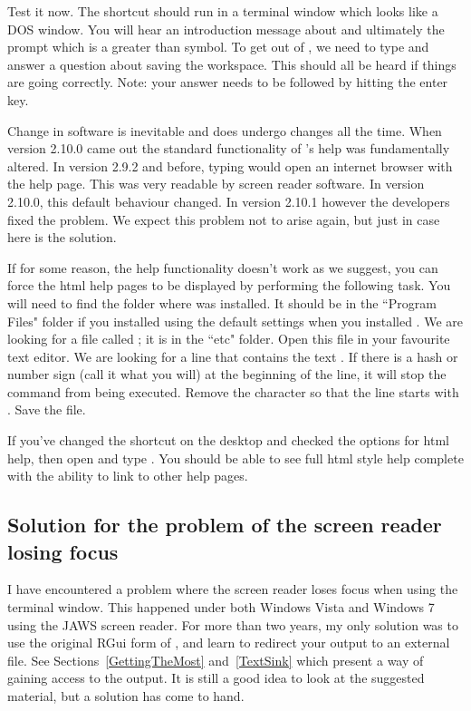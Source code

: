 Test it now. The shortcut should run \R{} in a terminal window which looks like a DOS window. You will hear an introduction message about \R{} and ultimately the prompt which is a greater than symbol. To get out of \R{}, we need to type  and answer a question about saving the workspace. This should all be heard if things are going correctly. Note: your answer needs to be followed by hitting the enter key.

Change in software is inevitable and \R{} does undergo changes all the time. When version 2.10.0 came out the standard functionality of \R{}'s help was fundamentally altered. In version 2.9.2 and before, typing  would open an internet browser with the help page. This was very readable by screen reader software. In version 2.10.0, this default behaviour changed. In version 2.10.1 however the developers fixed the problem. We expect this problem not to arise again, but just in case here is the solution.

If for some reason, the help functionality doesn't work as we suggest, you can force the html help pages to be displayed by performing the following task.
You will need to find the folder where \R{} was installed. It should be in the ``Program Files" folder if you installed using the default settings when you installed \R{}. We are looking for a file called ; it is in the ``etc" folder. Open this file in your favourite text editor. We are looking for a line that contains the text . If there is a hash or number sign (call it what you will) at the beginning of the line, it will stop the command from being executed. Remove the character so that the line starts with . Save the file.

If you've changed the shortcut on the desktop and checked the options for html help, then open \R{} and type . You should be able to see full html style help complete with the ability to link to other help pages.

\subsection{Solution for the problem of the screen reader losing focus}

I have encountered a problem where the screen reader loses focus when using the terminal window. This happened under both Windows Vista and Windows 7 using the JAWS screen reader. For more than two years, my only solution was to use the original RGui form of \R{}, and learn to redirect your output to an external file. See Sections~\ref{GettingTheMost} and~\ref{TextSink} which present a way of gaining access to the output. It is still a good idea to look at the suggested material, but a solution has come to hand.


